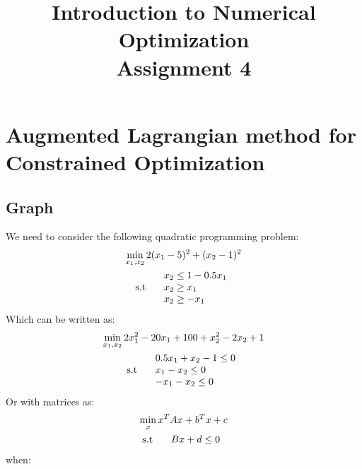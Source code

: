 \documentclass[12pt]{article}
\title{Introduction to Numerical Optimization\\Assignment 4}
\author{}
\begin{document}
\maketitle


\section{Augmented Lagrangian method for Constrained Optimization}

\subsection{Graph}

We need to consider the following quadratic programming problem:
\begin{gather*}
    \min_{x_1,x_2}  2(x_1-5)^2 + (x_2-1)^2 \\
    \text{s.t \quad}\begin{array}{lr}
        x_2 \leq 1 - 0.5x_1 \\
        x_2 \geq x_1 \\
        x_2 \geq -x_1
    \end{array}
\end{gather*}
Which can be written as:
\begin{gather*}
    \min_{x_1,x_2}  2x^2_1-20x_1+100  + x^2_2-2x_2+1 \\
    \text{s.t \quad}\begin{array}{lr}
        0.5x_1 + x_2 -1 \leq 0  \\
        x_1- x_2 \leq 0 \\
        -x_1- x_2 \leq 0
    \end{array}
\end{gather*}
Or with matrices as:
\begin{gather*}
    \min_{x}  x^TAx + b^Tx + c \\
    \text{s.t \quad}\begin{array}{lr}
        Bx + d  \leq 0
    \end{array}
\end{gather*}
when:
\end{document}
